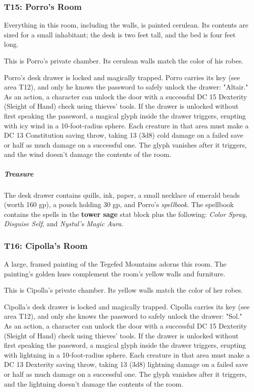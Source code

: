\documentclass[10pt,a4paper,twoside,bg=print,twocolumn,openany,nodeprecatedcode]{dndbook}
\begin{document}
\subsubsection{T15: Porro's Room}
\begin{DndReadAloud}{}
Everything in this room, including the walls, is painted cerulean. Its contents are sized for a small inhabitant; the desk is two feet tall, and the bed is four feet long.

\end{DndReadAloud}

This is Porro's private chamber. Its cerulean walls match the color of his robes.

Porro's desk drawer is locked and magically trapped. Porro carries its key (see area T12), and only he knows the password to safely unlock the drawer: "Altair." As an action, a character can unlock the door with a successful DC 15 Dexterity (Sleight of Hand) check using thieves' tools. If the drawer is unlocked without first speaking the password, a magical glyph inside the drawer triggers, erupting with icy wind in a 10-foot-radius sphere. Each creature in that area must make a DC 13 Constitution saving throw, taking 13 (3d8) cold damage on a failed save or half as much damage on a successful one. The glyph vanishes after it triggers, and the wind doesn't damage the contents of the room.

\subparagraph{Treasure}
The desk drawer contains quills, ink, paper, a small necklace of emerald beads (worth 160 gp), a pouch holding 30 gp, and Porro's \textit{spellbook}. The spellbook contains the spells in the \textbf{tower sage} stat block plus the following: \textit{Color Spray}, \textit{Disguise Self}, and \textit{Nystul's Magic Aura}.

\subsubsection{T16: Cipolla's Room}
\begin{DndReadAloud}{}
A large, framed painting of the Tegefed Mountains adorns this room. The painting's golden hues complement the room's yellow walls and furniture.

\end{DndReadAloud}

This is Cipolla's private chamber. Its yellow walls match the color of her robes.

Cipolla's desk drawer is locked and magically trapped. Cipolla carries its key (see area T12), and only she knows the password to safely unlock the drawer: "Sol." As an action, a character can unlock the door with a successful DC 15 Dexterity (Sleight of Hand) check using thieves' tools. If the drawer is unlocked without first speaking the password, a magical glyph inside the drawer triggers, erupting with lightning in a 10-foot-radius sphere. Each creature in that area must make a DC 13 Dexterity saving throw, taking 13 (3d8) lightning damage on a failed save or half as much damage on a successful one. The glyph vanishes after it triggers, and the lightning doesn't damage the contents of the room.
\end{document}
